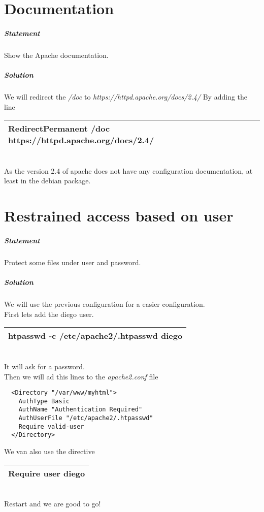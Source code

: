 \documentclass[a4paper,10pt]{article}
\begin{document}
\section{Documentation}
\subparagraph{Statement}
Show the Apache documentation.
\subparagraph{Solution}
We will redirect the {\it /doc} to {\it https://httpd.apache.org/docs/2.4/} By adding the line
\vspace{0.5cm}\\\begin{tabular}{|l|}\hline
RedirectPermanent /doc https://httpd.apache.org/docs/2.4/
\\\hline\end{tabular}\vspace{0.5cm}\\
As the version 2.4 of apache does not have any configuration documentation, at least in the debian package.

\section{Restrained access based on user}
\subparagraph{Statement}
Protect some files under user and password.
\subparagraph{Solution}
We will use the previous configuration for a easier configuration.\\
First lets add the diego user.
\vspace{0.5cm}\\\begin{tabular}{|l|}\hline
htpasswd -c /etc/apache2/.htpasswd diego
\\\hline\end{tabular}\vspace{0.5cm}\\
It will ask for a password.\\
Then we will ad this lines to the {\it apache2.conf} file
\begin{verbatim}
  <Directory "/var/www/myhtml">
    AuthType Basic
    AuthName "Authentication Required"
    AuthUserFile "/etc/apache2/.htpasswd"
    Require valid-user
  </Directory>
\end{verbatim}
We van also use the directive
\vspace{0.5cm}\\\begin{tabular}{|l|}\hline
Require user diego
\\\hline\end{tabular}\vspace{0.5cm}\\
Restart and we are good to go!
\pagebreak
\end{document}
